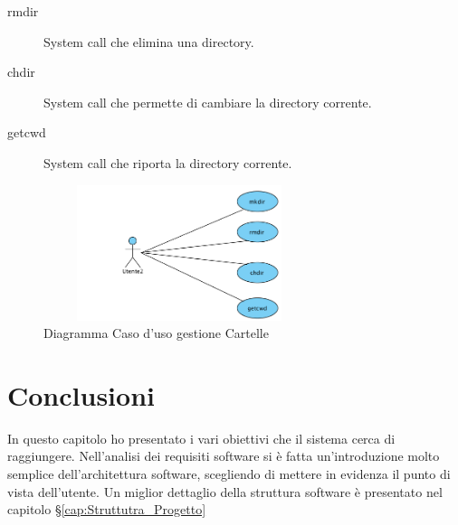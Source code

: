      \begin{description}
      \item[rmdir]System call che elimina una directory. 
      \end{description}
      
      \begin{description}
       \item[chdir] System call che permette di cambiare la directory corrente. 
       \end{description}

      \begin{description}
     \item[getcwd] System call che riporta la directory corrente. 
    \end{description}

\begin{figure}[h]
 \includegraphics[width=300px,height=150px]{./Immagini/UseDir.png}
\caption{Diagramma Caso d'uso gestione Cartelle}
\end{figure}

\section{Conclusioni}
  In questo capitolo ho presentato i vari obiettivi che il sistema cerca di raggiungere. Nell'analisi dei requisiti software si è fatta un'introduzione molto semplice dell'architettura software, scegliendo di mettere in evidenza il punto di vista dell'utente. Un miglior dettaglio della struttura software è presentato nel capitolo §\ref{cap:Struttutra_Progetto}



\clearpage{\pagestyle{empty}\cleardoublepage}
